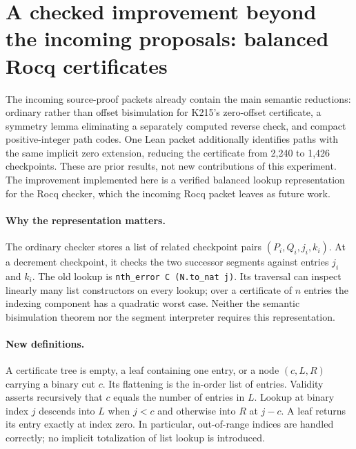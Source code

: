 \section{A checked improvement beyond the incoming proposals: balanced Rocq certificates}

The incoming source-proof packets already contain the main semantic reductions:
ordinary rather than offset bisimulation for K215's zero-offset certificate,
a symmetry lemma eliminating a separately computed reverse check, and compact
positive-integer path codes. One Lean packet additionally identifies paths
with the same implicit zero extension, reducing the certificate from 2,240 to
1,426 checkpoints. These are prior results, not new contributions of this
experiment. The improvement implemented here is a verified balanced lookup
representation for the Rocq checker, which the incoming Rocq packet leaves as
future work.

\paragraph{Why the representation matters.}
The ordinary checker stores a list of related checkpoint pairs
\((P_i,Q_i,j_i,k_i)\). At a decrement checkpoint, it checks the two successor
segments against entries \(j_i\) and \(k_i\). The old lookup is
\texttt{nth\_error C (N.to\_nat j)}. Its traversal can inspect linearly many
list constructors on every lookup; over a certificate of \(n\) entries the
indexing component has a quadratic worst case. Neither the semantic
bisimulation theorem nor the segment interpreter requires this representation.

\paragraph{New definitions.}
A certificate tree is empty, a leaf containing one entry, or a node
\((c,L,R)\) carrying a binary cut \(c\). Its flattening is the in-order list
of entries. Validity asserts recursively that \(c\) equals the number of
entries in \(L\). Lookup at binary index \(j\) descends into \(L\) when
\(j<c\) and otherwise into \(R\) at \(j-c\). A leaf returns its entry
exactly at index zero. In particular, out-of-range indices are handled
correctly; no implicit totalization of list lookup is introduced.

